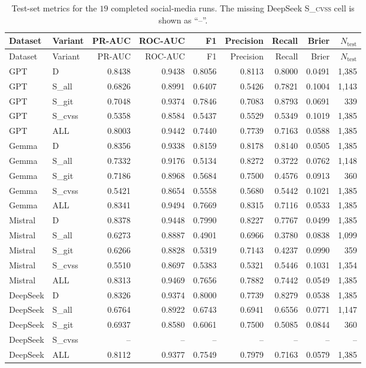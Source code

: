 \documentclass[11pt]{article}
\begin{document}
\small
\begin{longtable}{llrrrrrrr}
\caption{Test-set metrics for the $19$ completed social-media runs.
The missing DeepSeek \textsc{S\_cvss} cell is shown as ``--''.}\\
\toprule
Dataset & Variant & PR-AUC & ROC-AUC & F1 & Precision & Recall & Brier & $N_{\text{test}}$ \\
\midrule
\endfirsthead
\toprule
Dataset & Variant & PR-AUC & ROC-AUC & F1 & Precision & Recall & Brier & $N_{\text{test}}$ \\
\midrule
\endhead
\bottomrule
\endfoot

GPT      & D       & 0.8438 & 0.9438 & 0.8056 & 0.8113 & 0.8000 & 0.0491 & 1{,}385 \\
GPT      & S\_all  & 0.6826 & 0.8991 & 0.6407 & 0.5426 & 0.7821 & 0.1004 & 1{,}143 \\
GPT      & S\_git  & 0.7048 & 0.9374 & 0.7846 & 0.7083 & 0.8793 & 0.0691 &   339 \\
GPT      & S\_cvss & 0.5358 & 0.8584 & 0.5437 & 0.5529 & 0.5349 & 0.1019 & 1{,}385 \\
GPT      & ALL     & 0.8003 & 0.9442 & 0.7440 & 0.7739 & 0.7163 & 0.0588 & 1{,}385 \\

Gemma    & D       & 0.8356 & 0.9338 & 0.8159 & 0.8178 & 0.8140 & 0.0505 & 1{,}385 \\
Gemma    & S\_all  & 0.7332 & 0.9176 & 0.5134 & 0.8272 & 0.3722 & 0.0762 & 1{,}148 \\
Gemma    & S\_git  & 0.7186 & 0.8968 & 0.5684 & 0.7500 & 0.4576 & 0.0913 &   360 \\
Gemma    & S\_cvss & 0.5421 & 0.8654 & 0.5558 & 0.5680 & 0.5442 & 0.1021 & 1{,}385 \\
Gemma    & ALL     & 0.8341 & 0.9494 & 0.7669 & 0.8315 & 0.7116 & 0.0533 & 1{,}385 \\

Mistral  & D       & 0.8378 & 0.9448 & 0.7990 & 0.8227 & 0.7767 & 0.0499 & 1{,}385 \\
Mistral  & S\_all  & 0.6273 & 0.8887 & 0.4901 & 0.6966 & 0.3780 & 0.0838 & 1{,}099 \\
Mistral  & S\_git  & 0.6266 & 0.8828 & 0.5319 & 0.7143 & 0.4237 & 0.0990 &   359 \\
Mistral  & S\_cvss & 0.5510 & 0.8697 & 0.5383 & 0.5321 & 0.5446 & 0.1031 & 1{,}354 \\
Mistral  & ALL     & 0.8313 & 0.9469 & 0.7656 & 0.7882 & 0.7442 & 0.0549 & 1{,}385 \\

DeepSeek & D       & 0.8326 & 0.9374 & 0.8000 & 0.7739 & 0.8279 & 0.0538 & 1{,}385 \\
DeepSeek & S\_all  & 0.6764 & 0.8922 & 0.6743 & 0.6941 & 0.6556 & 0.0771 & 1{,}147 \\
DeepSeek & S\_git  & 0.6937 & 0.8580 & 0.6061 & 0.7500 & 0.5085 & 0.0844 &   360 \\
DeepSeek & S\_cvss & --     & --     & --     & --     & --     & --     & --      \\
DeepSeek & ALL     & 0.8112 & 0.9377 & 0.7549 & 0.7979 & 0.7163 & 0.0579 & 1{,}385 \\

\end{longtable}
\end{document}
